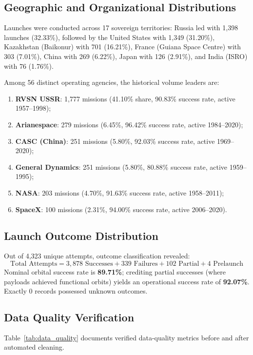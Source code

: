 \documentclass[10pt]{article}
\begin{document}
\subsection{Geographic and Organizational Distributions}
Launches were conducted across 17 sovereign territories: Russia led with 1,398 launches (32.33\%), followed by the United States with 1,349 (31.20\%), Kazakhstan (Baikonur) with 701 (16.21\%), France (Guiana Space Centre) with 303 (7.01\%), China with 269 (6.22\%), Japan with 126 (2.91\%), and India (ISRO) with 76 (1.76\%).

Among 56 distinct operating agencies, the historical volume leaders are:
\begin{enumerate}
    \item \textbf{RVSN USSR}: 1,777 missions (41.10\% share, 90.83\% success rate, active 1957--1998);
    \item \textbf{Arianespace}: 279 missions (6.45\%, 96.42\% success rate, active 1984--2020);
    \item \textbf{CASC (China)}: 251 missions (5.80\%, 92.03\% success rate, active 1969--2020);
    \item \textbf{General Dynamics}: 251 missions (5.80\%, 80.88\% success rate, active 1959--1995);
    \item \textbf{NASA}: 203 missions (4.70\%, 91.63\% success rate, active 1958--2011);
    \item \textbf{SpaceX}: 100 missions (2.31\%, 94.00\% success rate, active 2006--2020).
\end{enumerate}

\subsection{Launch Outcome Distribution}
Out of 4,323 unique attempts, outcome classification revealed:
\begin{equation}
    \text{Total Attempts} = 3,878 \text{ Successes} + 339 \text{ Failures} + 102 \text{ Partial} + 4 \text{ Prelaunch}
\end{equation}
Nominal orbital success rate is \textbf{89.71\%}; crediting partial successes (where payloads achieved functional orbits) yields an operational success rate of \textbf{92.07\%}. Exactly 0 records possessed unknown outcomes.

\subsection{Data Quality Verification}
Table~\ref{tab:data_quality} documents verified data-quality metrics before and after automated cleaning.
\end{document}
